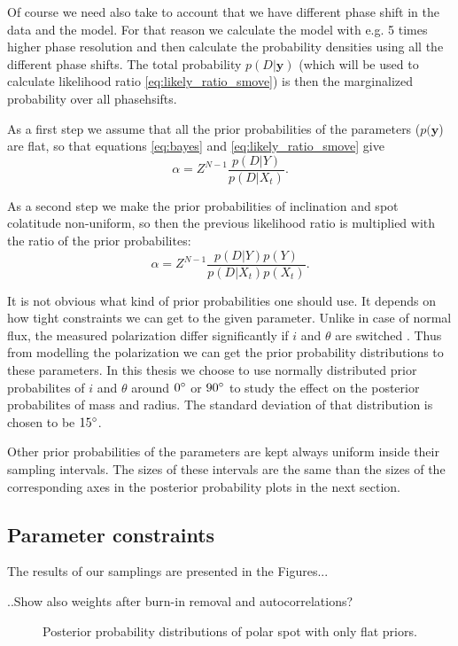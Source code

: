 \documentclass{wihuri}
\def\be{\begin{equation}}
\def\ee{\end{equation}}
\begin{document}
Of course we need also take to account that we have different phase shift in the data and the model. For that reason we calculate the model with e.g. 5 times higher phase resolution and then calculate the probability densities using all the different phase shifts. The total probability $p(D|\textbf{y})$ (which will be used to calculate likelihood ratio \ref{eq:likely_ratio_smove}) is then the marginalized probability over all phasehsifts. 

As a first step we assume that all the prior probabilities of the parameters ($p(\textbf{y}$) are flat, so that equations \ref{eq:bayes} and \ref{eq:likely_ratio_smove} give 
\be \label{eq:alpha1}
\alpha = Z^{N-1}\frac{p(D|Y)}{p(D|X_{t})}.
\ee

As a second step we make the prior probabilities of inclination and spot colatitude non-uniform, so then the previous likelihood ratio is multiplied with the ratio of the prior probabilites:
\be \label{eq:alpha2}
\alpha = Z^{N-1}\frac{p(D|Y)p(Y)}{p(D|X_{t})p(X_{t})}.
\ee

It is not obvious what kind of prior probabilities one should use. It depends on how tight constraints we can get to the given parameter. Unlike in case of normal flux, the measured polarization differ significantly if $i$ and $\theta$ are switched \cite{poutaviironen}. Thus from modelling the polarization we can get the prior probability distributions to these parameters. In this thesis we choose to use normally distributed prior probabilites of $i$ and $\theta$ around $0 \degree$ or $90 \degree$ to study the effect on the posterior probabilites of mass and radius. The standard deviation of that distribution is chosen to be $15 \degree$. 

Other prior probabilities of the parameters are kept always uniform inside their sampling intervals. The sizes of these intervals are the same than the sizes of the corresponding axes in the posterior probability plots in the next section. 



\subsection{Parameter constraints}

The results of our samplings are presented in the Figures...

..Show also weights after burn-in removal and autocorrelations?

\iffalse
\begin{figure}
\centerline{}
\caption{Posterior probability distributions of polar spot with only flat priors.
\label{fig:polpost}}
\end{figure}
\end{document}
